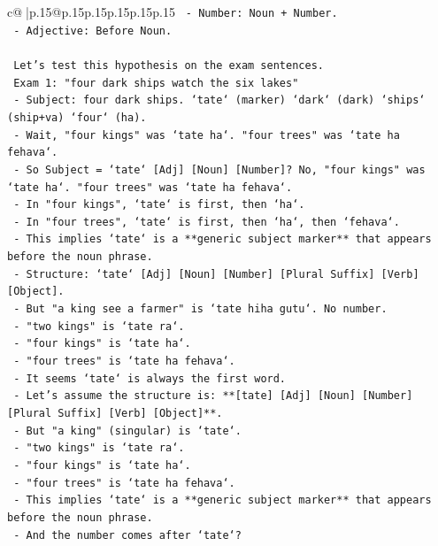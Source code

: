 \documentclass{article}
\begin{document}
{\begin{supertabular}{c@{$\;$}|p{.15\linewidth}@{}p{.15\linewidth}p{.15\linewidth}p{.15\linewidth}p{.15\linewidth}p{.15\linewidth}}
{{{\texttt{    {-} Number: Noun + Number.} \\
\texttt{    {-} Adjective: Before Noun.} \\
\\ 
\texttt{    Let's test this hypothesis on the exam sentences.} \\
\texttt{    Exam 1: "four dark ships watch the six lakes"} \\
\texttt{    {-} Subject: four dark ships. `tate` (marker) `dark` (dark) `ships` (ship+va) `four` (ha).} \\
\texttt{    {-} Wait, "four kings" was `tate ha`. "four trees" was `tate ha fehava`.} \\
\texttt{    {-} So Subject = `tate` {[}Adj{]} {[}Noun{]} {[}Number{]}? No, "four kings" was `tate ha`. "four trees" was `tate ha fehava`.} \\
\texttt{    {-} In "four kings", `tate` is first, then `ha`.} \\
\texttt{    {-} In "four trees", `tate` is first, then `ha`, then `fehava`.} \\
\texttt{    {-} This implies `tate` is a **generic subject marker** that appears before the noun phrase.} \\
\texttt{    {-} Structure: `tate` {[}Adj{]} {[}Noun{]} {[}Number{]} {[}Plural Suffix{]} {[}Verb{]} {[}Object{]}.} \\
\texttt{    {-} But "a king see a farmer" is `tate hiha gutu`. No number.} \\
\texttt{    {-} "two kings" is `tate ra`.} \\
\texttt{    {-} "four kings" is `tate ha`.} \\
\texttt{    {-} "four trees" is `tate ha fehava`.} \\
\texttt{    {-} It seems `tate` is always the first word.} \\
\texttt{    {-} Let's assume the structure is: **{[}tate{]} {[}Adj{]} {[}Noun{]} {[}Number{]} {[}Plural Suffix{]} {[}Verb{]} {[}Object{]}**.} \\
\texttt{    {-} But "a king" (singular) is `tate`.} \\
\texttt{    {-} "two kings" is `tate ra`.} \\
\texttt{    {-} "four kings" is `tate ha`.} \\
\texttt{    {-} "four trees" is `tate ha fehava`.} \\
\texttt{    {-} This implies `tate` is a **generic subject marker** that appears before the noun phrase.} \\
\texttt{    {-} And the number comes after `tate`?} \\
}}}
\end{supertabular}}
\end{document}
